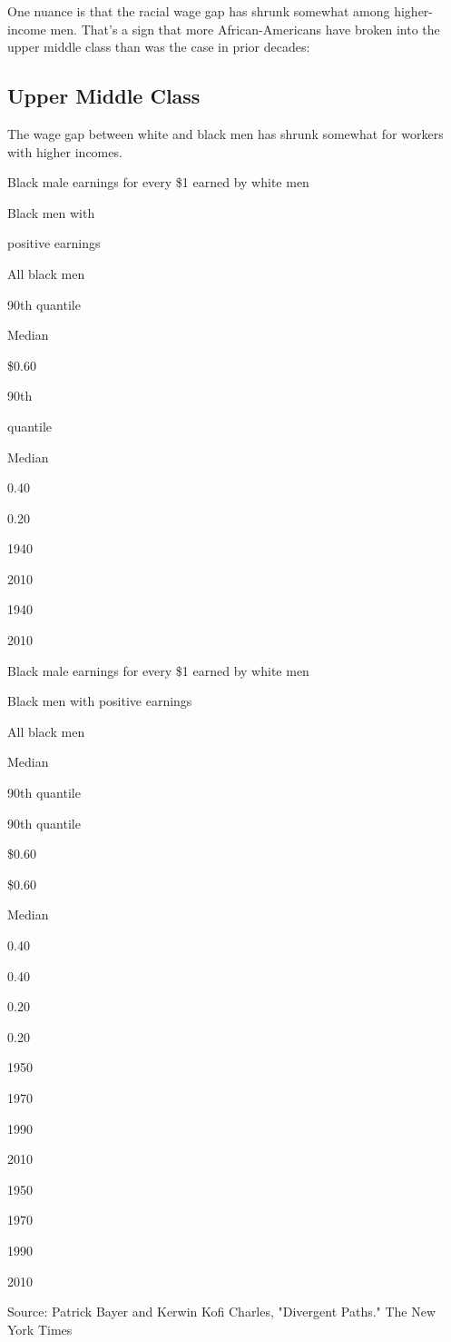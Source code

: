 One nuance is that the racial wage gap has shrunk somewhat among
higher-income men. That's a sign that more African-Americans have broken
into the upper middle class than was the case in prior decades:

\hypertarget{upper-middle-class}{%
\subsection{Upper Middle Class}\label{upper-middle-class}}

The wage gap between white and black men has shrunk somewhat for workers
with higher incomes.

Black male earnings for every \$1 earned by white men

Black men with

positive earnings

All black men

90th quantile

Median

\$0.60

90th

quantile

Median

0.40

0.20

1940

2010

1940

2010

Black male earnings for every \$1 earned by white men

Black men with positive earnings

All black men

Median

90th quantile

90th quantile

\$0.60

\$0.60

Median

0.40

0.40

0.20

0.20

1950

1970

1990

2010

1950

1970

1990

2010

Source: Patrick Bayer and Kerwin Kofi Charles, "Divergent Paths."
\textbar{} The New York Times

